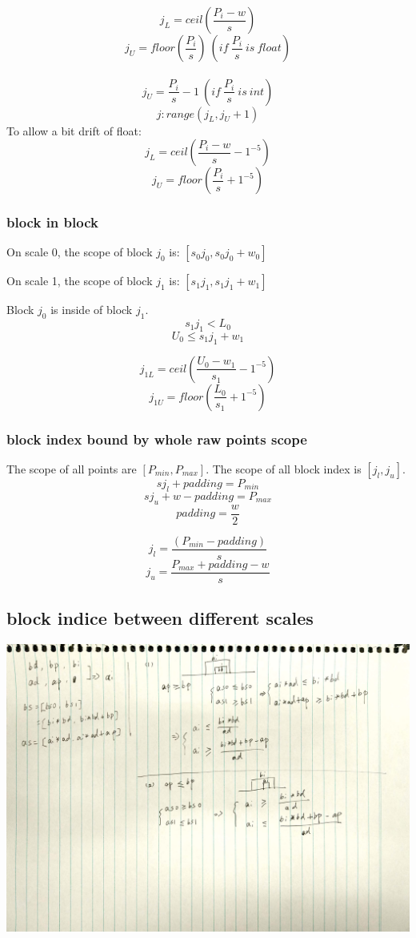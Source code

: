 \documentclass[,table,dvipsnames]{article}
\begin{document}
$$ j_L = ceil(\frac{P_i-w}{s}) $$
$$ j_U =  floor( \frac{P_i}{s})\ ( if\ \frac{P_i}{s}\ is\ float )$$\\
$$ j_U =  \frac{P_i}{s}-1\ ( if\ \frac{P_i}{s}\ is\ int )$$
$$ j:range(j_L, j_U+1) $$
To allow a bit drift of float:
$$ j_L = ceil(\frac{P_i-w}{s} - 1^{-5}) $$
$$ j_U =  floor( \frac{P_i}{s} + 1^{-5}) $$


\subsubsection{block in block}
On scale 0, the scope of block $j_0$ is: $[s_0j_0   ,s_0j_0+w_0]$ \par
On scale 1, the scope of block $j_1$ is: $[s_1j_1 ,s_1j_1+w_1]$ \par
Block $j_0$ is inside of block $j_1$.
$$ s_1j_1   <   L_0$$
$$ U_0  \leq  s_1j_1+w_1 $$

$$j_{1L}= ceil(\frac{U_0- w_1 }{s_1}-1^{-5})$$
$$j_{1U} = floor(\frac{L_0 }{s_1}+1^{-5})$$

\subsubsection{block index bound by whole raw points scope}
The scope of all points are $[P_{min}, P_{max}]$. The scope of all block index is $[j_l, j_u]$.
$$ sj_l+ padding = P_{min}$$
$$ sj_u+w-padding = P_{max} $$
$$ padding = \frac{w}{2}$$

$$ j_l = \frac{(P_{min}-padding)}{s} $$
$$ j_u = \frac{P_{max}+padding-w}{s} $$

\subsection{block indice between different scales}
\includegraphics[width=0.9\textheight]{theory/bxmap.png}
\end{document}
